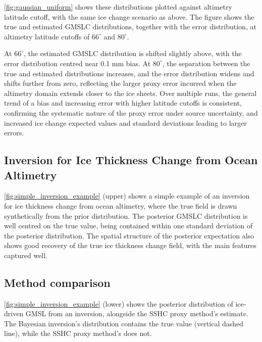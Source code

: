 \autoref{fig:gaussian_uniform} shows these distributions plotted against altimetry latitude cutoff, with the same ice change scenario as above. The figure shows the true and estimated GMSLC distributions, together with the error distribution, at altimetry latitude cutoffs of $66^\circ$ and $80^\circ$.



At $66^\circ$, the estimated GMSLC distribution is shifted slightly above, with the error distribution centred near 0.1 mm bias. At $80^\circ$, the separation between the true and estimated distributions increases, and the error distribution widens and shifts further from zero, reflecting the larger proxy error incurred when the altimetry domain extends closer to the ice sheets. Over multiple runs, the general trend of a bias and increasing error with higher latitude cutoffs is consistent, confirming the systematic nature of the proxy error under source uncertainty, and increased ice change expected values and standard deviations leading to larger errors.


\subsection{Inversion for Ice Thickness Change from Ocean Altimetry}



\autoref{fig:simple_inversion_example} (upper) shows a simple example of an inversion for ice thickness change from ocean altimetry, where the true field is drawn synthetically from the prior distribution. The posterior GMSLC distribution is well centred on the true value, being contained within one standard deviation of the posterior distribution. The spatial structure of the posterior expectation also shows good recovery of the true ice thickness change field, with the main features captured well.

\subsection{Method comparison}

\autoref{fig:simple_inversion_example} (lower) shows the posterior distribution of ice-driven GMSL from an inversion, alongside the SSHC proxy method's estimate. The Bayesian inversion's distribution contains the true value (vertical dashed line), while the SSHC proxy method's does not.


